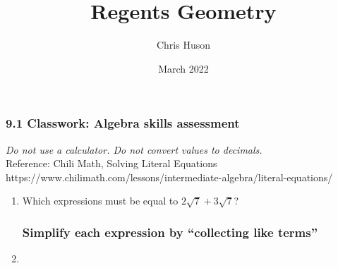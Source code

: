 \documentclass[12pt, twoside]{article}
\title{Regents Geometry}
\author{Chris Huson}
\date{March 2022}
\begin{document}
\subsubsection*{9.1 Classwork: Algebra skills assessment}
\emph{Do not use a calculator. Do not convert values to decimals.}\\
Reference: Chili Math, Solving Literal Equations \\
https://www.chilimath.com/lessons/intermediate-algebra/literal-equations/

\begin{enumerate}
  \item Which expressions must be equal to $2\sqrt{7}+3\sqrt{7}$?
  \begin{itemize}[label=$\square$]
      \end{itemize} \vspace{0.5cm}
      
\subsubsection*{Simplify each expression by ``collecting like terms''}
\item 
\begin{enumerate}[itemsep=2cm]
    \end{enumerate} \vspace{0.5cm}
  

\end{enumerate}
\end{document}

